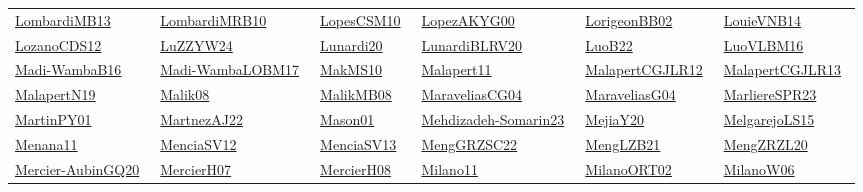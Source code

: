 \begin{longtable}{*{6}{l}}
\href{../works/LombardiMB13.pdf}{LombardiMB13}~\cite{LombardiMB13} & \href{../works/LombardiMRB10.pdf}{LombardiMRB10}~\cite{LombardiMRB10} & \href{../works/LopesCSM10.pdf}{LopesCSM10}~\cite{LopesCSM10} & \href{../works/LopezAKYG00.pdf}{LopezAKYG00}~\cite{LopezAKYG00} & \href{../works/LorigeonBB02.pdf}{LorigeonBB02}~\cite{LorigeonBB02} & \href{../works/LouieVNB14.pdf}{LouieVNB14}~\cite{LouieVNB14}\\ 
\href{../works/LozanoCDS12.pdf}{LozanoCDS12}~\cite{LozanoCDS12} & \href{../works/LuZZYW24.pdf}{LuZZYW24}~\cite{LuZZYW24} & \href{../works/Lunardi20.pdf}{Lunardi20}~\cite{Lunardi20} & \href{../works/LunardiBLRV20.pdf}{LunardiBLRV20}~\cite{LunardiBLRV20} & \href{../works/LuoB22.pdf}{LuoB22}~\cite{LuoB22} & \href{../works/LuoVLBM16.pdf}{LuoVLBM16}~\cite{LuoVLBM16}\\ 
\href{../works/Madi-WambaB16.pdf}{Madi-WambaB16}~\cite{Madi-WambaB16} & \href{../works/Madi-WambaLOBM17.pdf}{Madi-WambaLOBM17}~\cite{Madi-WambaLOBM17} & \href{../works/MakMS10.pdf}{MakMS10}~\cite{MakMS10} & \href{../works/Malapert11.pdf}{Malapert11}~\cite{Malapert11} & \href{../works/MalapertCGJLR12.pdf}{MalapertCGJLR12}~\cite{MalapertCGJLR12} & \href{../works/MalapertCGJLR13.pdf}{MalapertCGJLR13}~\cite{MalapertCGJLR13}\\ 
\href{../works/MalapertN19.pdf}{MalapertN19}~\cite{MalapertN19} & \href{../works/Malik08.pdf}{Malik08}~\cite{Malik08} & \href{../works/MalikMB08.pdf}{MalikMB08}~\cite{MalikMB08} & \href{../}{MaraveliasCG04}~\cite{MaraveliasCG04} & \href{../works/MaraveliasG04.pdf}{MaraveliasG04}~\cite{MaraveliasG04} & \href{../works/MarliereSPR23.pdf}{MarliereSPR23}~\cite{MarliereSPR23}\\ 
\href{../works/MartinPY01.pdf}{MartinPY01}~\cite{MartinPY01} & \href{../}{MartnezAJ22}~\cite{MartnezAJ22} & \href{../works/Mason01.pdf}{Mason01}~\cite{Mason01} & \href{../works/Mehdizadeh-Somarin23.pdf}{Mehdizadeh-Somarin23}~\cite{Mehdizadeh-Somarin23} & \href{../works/MejiaY20.pdf}{MejiaY20}~\cite{MejiaY20} & \href{../works/MelgarejoLS15.pdf}{MelgarejoLS15}~\cite{MelgarejoLS15}\\ 
\href{../works/Menana11.pdf}{Menana11}~\cite{Menana11} & \href{../works/MenciaSV12.pdf}{MenciaSV12}~\cite{MenciaSV12} & \href{../works/MenciaSV13.pdf}{MenciaSV13}~\cite{MenciaSV13} & \href{../}{MengGRZSC22}~\cite{MengGRZSC22} & \href{../}{MengLZB21}~\cite{MengLZB21} & \href{../works/MengZRZL20.pdf}{MengZRZL20}~\cite{MengZRZL20}\\ 
\href{../works/Mercier-AubinGQ20.pdf}{Mercier-AubinGQ20}~\cite{Mercier-AubinGQ20} & \href{../}{MercierH07}~\cite{MercierH07} & \href{../works/MercierH08.pdf}{MercierH08}~\cite{MercierH08} & \href{../}{Milano11}~\cite{Milano11} & \href{../}{MilanoORT02}~\cite{MilanoORT02} & \href{../works/MilanoW06.pdf}{MilanoW06}~\cite{MilanoW06}\\ 

\end{longtable}
